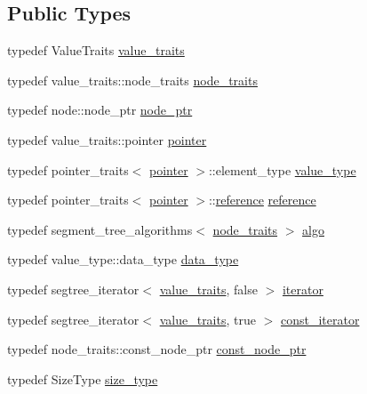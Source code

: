 \subsection*{Public Types}
\begin{DoxyCompactItemize}
\item 
typedef Value\+Traits \hyperlink{classboost_1_1intrusive_1_1segment__tree__impl_a929c1b3f1e6bb851a911b9b54a4c0dc2}{value\+\_\+traits}
\item 
typedef value\+\_\+traits\+::node\+\_\+traits \hyperlink{classboost_1_1intrusive_1_1segment__tree__impl_a4530e7ef515902af7c906bbe0c6bb5f2}{node\+\_\+traits}
\item 
typedef node\+::node\+\_\+ptr \hyperlink{classboost_1_1intrusive_1_1segment__tree__impl_a3fcf2b7f82b582e4dcf22eca8914f664}{node\+\_\+ptr}
\item 
typedef value\+\_\+traits\+::pointer \hyperlink{classboost_1_1intrusive_1_1segment__tree__impl_a4345924066a33f309182d027249887ab}{pointer}
\item 
typedef pointer\+\_\+traits$<$ \hyperlink{classboost_1_1intrusive_1_1segment__tree__impl_a4345924066a33f309182d027249887ab}{pointer} $>$\+::element\+\_\+type \hyperlink{classboost_1_1intrusive_1_1segment__tree__impl_ab1fd253eacbcdbacb8e5e73fc580626d}{value\+\_\+type}
\item 
typedef pointer\+\_\+traits$<$ \hyperlink{classboost_1_1intrusive_1_1segment__tree__impl_a4345924066a33f309182d027249887ab}{pointer} $>$\+::\hyperlink{classboost_1_1intrusive_1_1segment__tree__impl_a62cd48d63afd795ad2c6f979266abe94}{reference} \hyperlink{classboost_1_1intrusive_1_1segment__tree__impl_a62cd48d63afd795ad2c6f979266abe94}{reference}
\item 
typedef segment\+\_\+tree\+\_\+algorithms$<$ \hyperlink{classboost_1_1intrusive_1_1segment__tree__impl_a4530e7ef515902af7c906bbe0c6bb5f2}{node\+\_\+traits} $>$ \hyperlink{classboost_1_1intrusive_1_1segment__tree__impl_a826a6c90baa684755f5035b74683e762}{algo}
\item 
typedef value\+\_\+type\+::data\+\_\+type \hyperlink{classboost_1_1intrusive_1_1segment__tree__impl_a92c83c631da1bcdaa004756ea98b2ec5}{data\+\_\+type}
\item 
typedef segtree\+\_\+iterator$<$ \hyperlink{classboost_1_1intrusive_1_1segment__tree__impl_a929c1b3f1e6bb851a911b9b54a4c0dc2}{value\+\_\+traits}, false $>$ \hyperlink{classboost_1_1intrusive_1_1segment__tree__impl_a9f1be9b01be5078fb59b2e34520b374a}{iterator}
\item 
typedef segtree\+\_\+iterator$<$ \hyperlink{classboost_1_1intrusive_1_1segment__tree__impl_a929c1b3f1e6bb851a911b9b54a4c0dc2}{value\+\_\+traits}, true $>$ \hyperlink{classboost_1_1intrusive_1_1segment__tree__impl_a6957e501101f1d5427f611f6ee8d1ded}{const\+\_\+iterator}
\item 
typedef node\+\_\+traits\+::const\+\_\+node\+\_\+ptr \hyperlink{classboost_1_1intrusive_1_1segment__tree__impl_aa0f2dc05aa707192c6daa27f509642ed}{const\+\_\+node\+\_\+ptr}
\item 
typedef Size\+Type \hyperlink{classboost_1_1intrusive_1_1segment__tree__impl_ad11efa20e1eb479bc39e13ea312ca088}{size\+\_\+type}
\end{DoxyCompactItemize}
